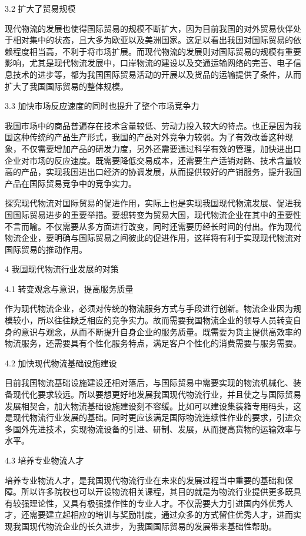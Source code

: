 3.2 扩大了贸易规模

现代物流的发展也使得国际贸易的规模不断扩大，因为目前我国的对外贸易伙伴处于相对集中的状态，且大多为欧亚以及美洲国家。这足以看出我国对国际贸易的依赖程度相当高，不利于将市场扩展。而现代物流的发展则对国际贸易的规模有重要影响，尤其是现代物流发展中，口岸物流的建设以及交通运输网络的完善、电子信息技术的进步等，都为我国国际贸易活动的开展以及货品的运输提供了条件，从而扩大了我国国际贸易的整体规模。

3.3 加快市场反应速度的同时也提升了整个市场竞争力

我国市场中的商品普遍存在技术含量较低、劳动力投入较大的特点。也正是因为我国这种传统的产品生产形式，我国的产品对外竞争力较弱。为了有效改善这种现象，不仅需要增加产品的研发力度，另外还需要通过科学有效的管理，加快进出口企业对市场的反应速度。既需要降低交易成本，还需要生产适销对路、技术含量较高的产品，实现我国进出口经济的协调发展，从而提供较好的产销服务，提升我国产品在国际贸易竞争中的竞争实力。

探究现代物流对国际贸易的促进作用，实际上也是实现我国现代物流发展、促进我国国际贸易进步的重要举措。要想转变为贸易大国，现代物流企业在其中的重要性不言而喻。不仅需要从多方面进行改变，同时还需要历经长时间的付出。作为现代物流企业，要明确与国际贸易之间彼此的促进作用，这样将有利于实现现代物流对国际贸易的推动作用。

4 我国现代物流行业发展的对策

4.1 转变观念与意识，提高服务质量

作为现代物流企业，必须对传统的物流服务方式与手段进行创新。物流企业因为规模较小，所以往往缺乏相应的竞争实力。故而需要我国物流企业的领导人员转变自身的意识与观念，从而不断提升自身企业的服务质量。既需要为货主提供高效率的物流服务，还需要具有个性化服务特点，满足客户个性化的消费需要与服务需要。

4.2 加快现代物流基础设施建设

目前我国物流基础设施建设还相对落后，与国际贸易中需要实现的物流机械化、装备现代化要求较远。所以要想更好地发展我国现代物流行业，并且使之与国际贸易发展相契合，加大物流基础设施建设刻不容缓。比如可以建设集装箱专用码头，这是现代物流行业发展的基础。同时更应该满足国际物流连续性作业的要求，引进众多国外先进技术，实现物流设备的引进、研制、发展，从而提高货物的运输效率与水平。

4.3 培养专业物流人才

培养专业物流人才，是我国现代物流行业在未来的发展过程当中重要的基础和保障。所以许多院校也可以开设物流相关课程，其目的就是为物流行业提供更多既具有较强理论性，又具有极强操作性的专业人才。不仅需要大力引进国内外优秀人才，还需要建立起相应的培训与奖励制度，通过众多的方式留住优秀人才，进而实现我国现代物流企业的长久进步，为我国国际贸易的发展带来基础性帮助。

